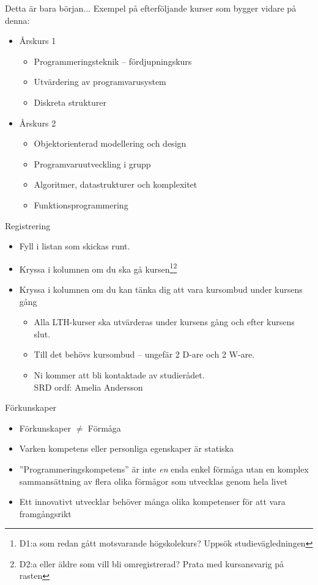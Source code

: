 \ifkompendium\else
\begin{Slide}{Detta är bara början... }
Exempel på efterföljande kurser som bygger vidare på denna:
\begin{itemize}
\item Årskurs 1
\begin{itemize}
\item Programmeringsteknik -- fördjupningskurs
\item Utvärdering av programvarusystem
\item Diskreta strukturer
\end{itemize}
\item Årskurs 2
\begin{itemize}
\item Objektorienterad modellering och design
\item Programvaruutveckling i grupp
\item Algoritmer, datastrukturer och komplexitet
\item Funktionsprogrammering
\end{itemize}
\end{itemize}
\end{Slide}


\begin{Slide}{Registrering}
\begin{itemize}
\item Fyll i listan som skickas runt.
\item Kryssa i kolumnen  om du ska gå kursen\footnote{\scriptsize D1:a som redan gått motsvarande högskolekurs? Uppsök studievägledningen}\footnote{\scriptsize D2:a eller äldre som vill bli omregistrerad? Prata med kursansvarig på rasten}
\item Kryssa i kolumnen  om du kan tänka dig att vara kursombud under kursens gång
\begin{itemize}
\item Alla LTH-kurser ska utvärderas under kursens gång och efter kursens slut.
\item Till det behövs kursombud -- ungefär 2 D-are och 2 W-are.
\item Ni kommer att bli kontaktade av studierådet. \\SRD ordf: Amelia Andersson
\end{itemize}
\end{itemize}
\end{Slide}

\begin{Slide}{Förkunskaper}
\begin{itemize}
\item Förkunskaper $\neq$ Förmåga
\item Varken kompetens eller personliga egenskaper är statiska 
\item ''Programmeringskompetens'' är inte \textit{en} enda enkel förmåga utan en komplex sammansättning av flera olika förmågor som utvecklas genom hela livet
\item Ett innovativt utvecklar behöver många olika kompetenser för att vara framgångsrikt
\end{itemize}
\end{Slide}

